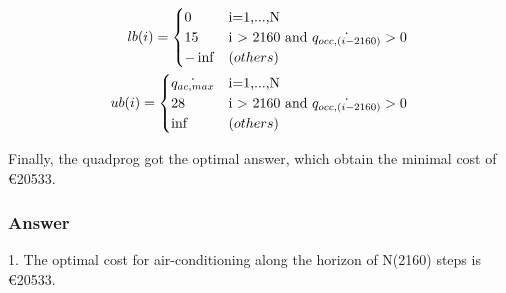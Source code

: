 \documentclass[titlepage,a4paper]{article}
\begin{document}
        \begin{equation}
            \begin{aligned}
                lb(i)=
                \begin{cases}
                   0  & \text{i=1,...,N} \\
                   15 & \text{i > 2160 and $ \dot{q_{occ,(i-2160)}} >0 $} \\
                   -\inf & \text (others)
                \end{cases} \\
                ub(i)=
                \begin{cases}
                   \dot{q_{ac,max}}  & \text{i=1,...,N} \\
                   28 & \text{i > 2160 and $ \dot{q_{occ,(i-2160)}} >0 $} \\
                   \inf & \text (others)
                \end{cases}
            \end{aligned}
        \end{equation}

        Finally, the quadprog got the optimal answer, which obtain the minimal cost of \euro 20533.




        \subsubsection{Answer}
        1. The optimal cost for air-conditioning along the horizon of N(2160) steps is \euro 20533.



\ifx \allfiles \undefined    
\end{document}
